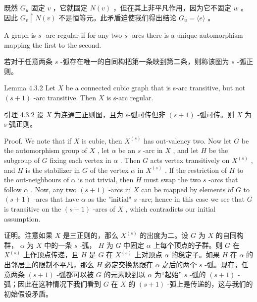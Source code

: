 \documentclass[10pt]{article}
\begin{document}
\begin{tcolorbox}\relax
既然 \({G}_{u}\) 固定 \(v\) ，它就固定 \(N\left( v\right)\) ，但在其上非平凡作用，因为它不固定 \(w\) 。因此 \({G}_{v} \upharpoonright  N\left( v\right)\) 不是恒等元。此矛盾迫使我们得出结论 \({G}_{u} = \langle e\rangle\) 。
\end{tcolorbox}

A graph is \(s\) -arc regular if for any two \(s\) -arcs there is a unique automorphism mapping the first to the second.

\begin{tcolorbox}\relax
若对于任意两条 \(s\) -弧存在唯一的自同构把第一条映到第二条，则称该图为 \(s\) -弧正则。
\end{tcolorbox}

Lemma 4.3.2 Let \(X\) be a connected cubic graph that is s-arc transitive, but not \(\left( {s + 1}\right)\) -arc transitive. Then \(X\) is s-arc regular.

\begin{tcolorbox}\relax
引理 4.3.2 设 \(X\) 为连通三正则图，且为 s-弧可传但非 \(\left( {s + 1}\right)\) -弧可传。则 \(X\) 为 s-弧正则。
\end{tcolorbox}

Proof. We note that if \(X\) is cubic, then \({X}^{\left( s\right) }\) has out-valency two. Now let \(G\) be the automorphism group of \(X\) , let \(\alpha\) be an \(s\) -arc in \(X\) , and let \(H\) be the subgroup of \(G\) fixing each vertex in \(\alpha\) . Then \(G\) acts vertex transitively on \({X}^{\left( s\right) }\) , and \(H\) is the stabilizer in \(G\) of the vertex \(\alpha\) in \({X}^{\left( s\right) }\) . If the restriction of \(H\) to the out-neighbours of \(\alpha\) is not trivial, then \(H\) must swap the two \(s\) -arcs that follow \(\alpha\) . Now, any two \(\left( {s + 1}\right)\) -arcs in \(X\) can be mapped by elements of \(G\) to \(\left( {s + 1}\right)\) -arcs that have \(\alpha\) as the "initial" \(s\) -arc; hence in this case we see that \(G\) is transitive on the \(\left( {s + 1}\right)\) -arcs of \(X\) , which contradicts our initial assumption.

\begin{tcolorbox}\relax
证明。注意如果 \(X\) 是三正则的，那么 \({X}^{\left( s\right) }\) 的出度为二。设 \(G\) 为 \(X\) 的自同构群， \(\alpha\) 为 \(X\) 中的一条 \(s\) -弧， \(H\) 为 \(G\) 中固定 \(\alpha\) 上每个顶点的子群。则 \(G\) 在 \({X}^{\left( s\right) }\) 上作顶点传递，且 \(H\) 是 \(G\) 在 \({X}^{\left( s\right) }\) 上对顶点 \(\alpha\) 的稳定子。如果 \(H\) 在 \(\alpha\) 的出邻居上的限制不平凡，那么 \(H\) 必定交换紧跟在 \(\alpha\) 之后的两个 \(s\) -弧。现在，任意两条 \(\left( {s + 1}\right)\) -弧都可以被 \(G\) 的元素映到以 \(\alpha\) 为“起始” \(s\) -弧的 \(\left( {s + 1}\right)\) -弧；因此在这种情况下我们看到 \(G\) 在 \(X\) 的 \(\left( {s + 1}\right)\) -弧上是传递的，这与我们的初始假设矛盾。
\end{tcolorbox}
\end{document}
